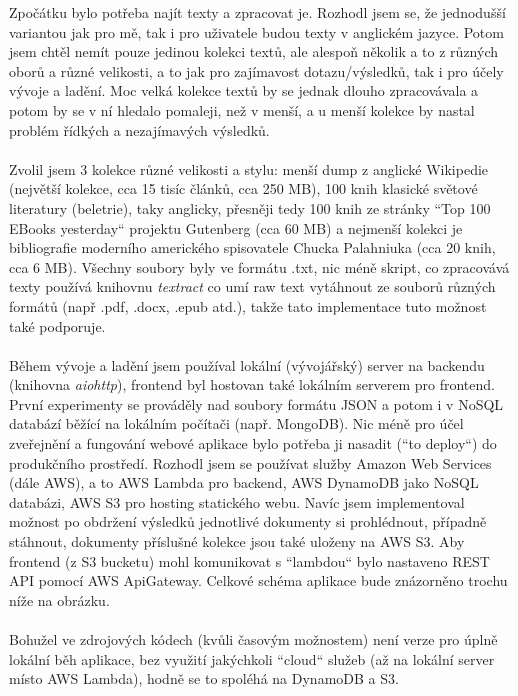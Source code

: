 \documentclass[a4paper,titlepage]{article}
\begin{document}
Zpočátku bylo potřeba najít texty a zpracovat je. Rozhodl jsem se, že jednodušší variantou jak pro mě,
tak i pro uživatele budou texty v anglickém jazyce. Potom jsem chtěl nemít pouze jedinou kolekci textů,
ale alespoň několik a to z různých oborů a různé velikosti, a to jak pro zajímavost dotazu/výsledků,
tak i pro účely vývoje a ladění. Moc velká kolekce textů by se jednak dlouho zpracovávala a potom by se
v ní hledalo pomaleji, než v menší, a u menší kolekce by nastal problém řídkých a nezajímavých výsledků.
\\~\\
Zvolil jsem 3 kolekce různé velikosti a stylu: menší dump z anglické Wikipedie (největší kolekce,
cca 15 tisíc článků, cca 250 MB), 100 knih klasické světové literatury (beletrie), taky anglicky,
přesněji tedy 100 knih ze stránky ``Top 100 EBooks yesterday`` projektu Gutenberg (cca 60 MB) a nejmenší
kolekci je bibliografie moderního amerického spisovatele Chucka Palahniuka (cca 20 knih, cca 6 MB).
Všechny soubory byly ve formátu .txt, nic méně skript, co zpracovává texty používá knihovnu
\emph{textract} co umí raw text vytáhnout ze souborů různých
formátů (např .pdf, .docx, .epub atd.), takže tato implementace tuto možnost také podporuje.
\\~\\
Během vývoje a ladění jsem používal lokální (vývojářský) server na backendu (knihovna \emph{aiohttp}),
frontend byl hostovan také lokálním serverem pro frontend. První experimenty se prováděly nad soubory
formátu JSON a potom i v NoSQL databází běžící na lokálním počítači (např. MongoDB).
Nic méně pro účel zveřejnění a fungování webové aplikace bylo potřeba ji nasadit (``to deploy``) do
produkčního prostředí. Rozhodl jsem se používat služby Amazon Web Services (dále AWS), a to AWS Lambda
pro backend, AWS DynamoDB jako NoSQL databázi, AWS S3 pro hosting statického webu. Navíc jsem
implementoval možnost po obdržení výsledků jednotlivé dokumenty si prohlédnout, případně
stáhnout, dokumenty příslušné kolekce jsou také uloženy na AWS S3.
Aby frontend (z S3 bucketu) mohl komunikovat s ``lambdou`` bylo nastaveno REST API pomocí AWS ApiGateway.
Celkové schéma aplikace bude znázorněno trochu níže na obrázku.
\\~\\
Bohužel ve zdrojových kódech (kvůli časovým možnostem) není verze pro úplně lokální běh aplikace,
bez využití jakýchkoli ``cloud`` služeb (až na lokální server místo AWS Lambda), hodně se to spoléhá
na DynamoDB a S3.
\clearpage
\end{document}
